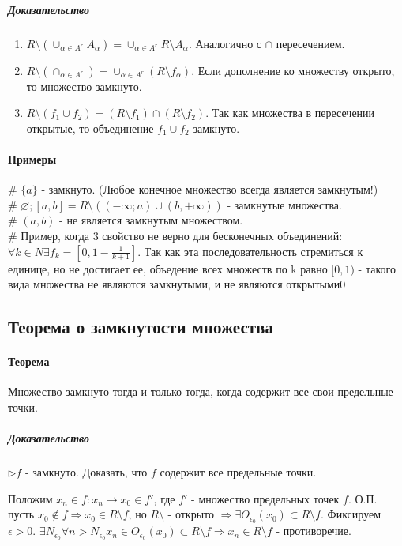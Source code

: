 \documentclass[10pt]{article}
\begin{document}
			\subparagraph{Доказательство}
				\begin{enumerate}
					\item $R\setminus(\cup_{\alpha \in A^r} A_\alpha) = \cup_{\alpha \in A^r} R\setminus A_\alpha$. Аналогично с $\cap$ пересечением.
					
					\item $R\setminus (\cap_{\alpha \in A^r}) = \cup_{\alpha \in A^r}(R\setminus f_\alpha)$. Если дополнение ко множеству открыто, то множество замкнуто.
					
					\item $R\setminus(f_1 \cup f_2) = (R\setminus f_1) \cap (R\setminus f_2)$. Так как множества в пересечении открытые, то объединение $f_1 \cup f_2$ замкнуто.
				\end{enumerate}
				
			\paragraph{Примеры}
				\# $\{a\}$ - замкнуто. (Любое конечное множество всегда является замкнутым!)\\
				\# $\varnothing; [a, b] = R\setminus( (-\infty; a) \cup (b, +\infty) )$ - замкнутые множества.\\
				\# $(a, b)$ - не является замкнутым множеством.\\
				\# Пример, когда 3 свойство не верно для бесконечных объединений: $\forall k \in N \exists f_k = [0, 1 - \frac{1}{k+1}]$. Так как эта последовательность стремиться к единице, но не достигает ее, объедение всех множеств по k равно $[0, 1)$ - такого вида множества не являются замкнутыми, и не являются открытыми0
				
		\subsection{Теорема о замкнутости множества}
			\paragraph{Теорема} Множество замкнуто тогда и только тогда, когда содержит все свои предельные точки.
			\subparagraph{Доказательство}
				$\rhd f$ - замкнуто. Доказать, что $f$ содержит все предельные точки.
				
				Положим $x_n \in f : x_n \to x_0 \in f'$, где $f'$ - множество предельных точек $f$.
				О.П. пусть $x_0 \notin f \Rightarrow x_0 \in R \setminus f$, но $R\setminus$ - открыто $\Rightarrow \exists O_{\epsilon_0} (x_0) \subset R \setminus f$. 
				Фиксируем $\epsilon > 0$. $\exists N_{\epsilon_0} \forall n > N_{\epsilon_0} x_n \in O_{\epsilon_0} (x_0) \subset R \setminus f \Rightarrow x_n \in R \setminus f$ - противоречие.
				
\end{document}
